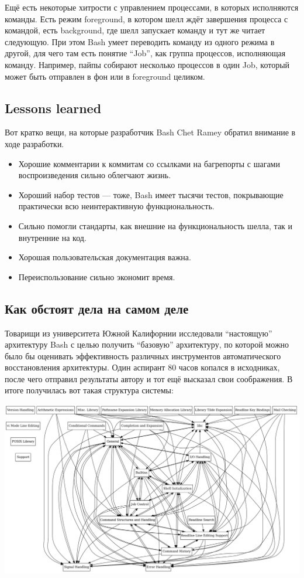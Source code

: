 \documentclass[a5paper]{article}
\begin{document}
Ещё есть некоторые хитрости с управлением процессами, в которых исполняются команды. Есть режим foreground, в котором шелл ждёт завершения процесса с командой, есть background, где шелл запускает команду и тут же читает следующую. При этом Bash умеет переводить команду из одного режима в другой, для чего там есть понятие ``Job'', как группа процессов, исполняющая команду. Например, пайпы собирают несколько процессов в один Job, который может быть отправлен в фон или в foreground целиком.

\subsection{Lessons learned}

Вот кратко вещи, на которые разработчик Bash Chet Ramey обратил внимание в ходе разработки.

\begin{itemize}
	\item Хорошие комментарии к коммитам со ссылками на багрепорты с шагами воспроизведения сильно облегчают жизнь.
	\item Хороший набор тестов --- тоже, Bash имеет тысячи тестов, покрывающие практически всю неинтерактивную функциональность.
	\item Сильно помогли стандарты, как внешние на функциональность шелла, так и внутренние на код.
	\item Хорошая пользовательская документация важна.
	\item Переиспользование сильно экономит время.
\end{itemize}

\subsection{Как обстоят дела на самом деле}

Товарищи из университета Южной Калифорнии исследовали ``настоящую'' архитектуру Bash с целью получить ``базовую'' архитектуру, по которой можно было бы оценивать эффективность различных инструментов автоматического восстановления архитектуры. Один аспирант 80 часов копался в исходниках, после чего отправил результаты автору и тот ещё высказал свои соображения. В итоге получилась вот такая структура системы:

\begin{center}
	\includegraphics[width=\textwidth]{bashRealArchitecture.png}
\end{center}
\end{document}
